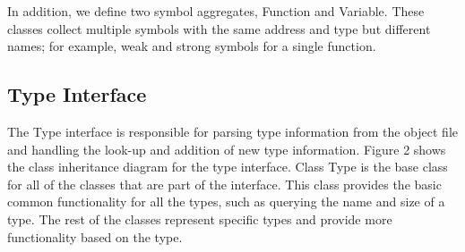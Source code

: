 In addition, we define two symbol aggregates, Function and Variable. These classes collect multiple symbols with the same address and type but different names; for example, weak and strong symbols for a single function. 

\subsection{Type Interface}
 The Type interface is responsible for parsing type information from the object file and handling the look-up and addition of new type information. Figure 2 shows the class inheritance diagram for the type interface. Class Type is the base class for all of the classes that are part of the interface. This class provides the basic common functionality for all the types, such as querying the name and size of a type. The rest of the classes represent specific types and provide more functionality based on the type. 

